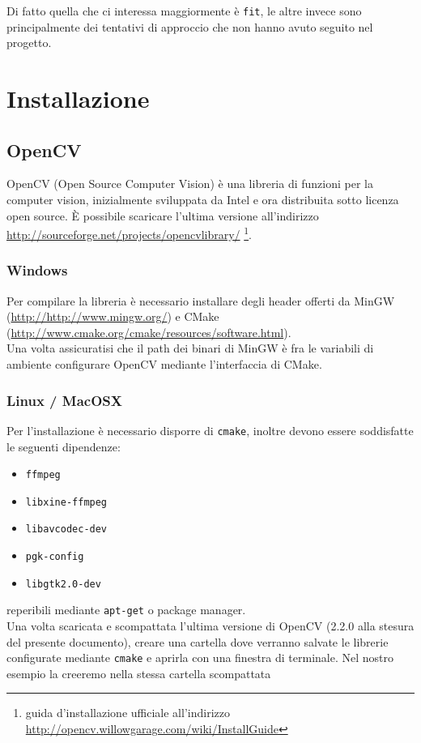 \documentclass[12pt]{report}
\begin{document}
\noindent Di fatto quella che ci interessa maggiormente \`e \verb|fit|, le altre invece sono principalmente dei tentativi di approccio che non hanno avuto seguito nel progetto.

\chapter{Installazione}
\section{OpenCV}
OpenCV (Open Source Computer Vision) \`e una libreria di funzioni per la computer vision, inizialmente sviluppata da Intel e ora distribuita sotto licenza open source. \`E possibile scaricare l'ultima versione all'indirizzo \url{http://sourceforge.net/projects/opencvlibrary/} \footnote{guida d'installazione ufficiale all'indirizzo \url{http://opencv.willowgarage.com/wiki/InstallGuide}}.

\subsection{Windows}
Per compilare la libreria \`e necessario installare degli header offerti da MinGW (\url{http://http://www.mingw.org/}) e CMake (\url{http://www.cmake.org/cmake/resources/software.html}).\\
\noindent Una volta assicuratisi che il path dei binari di MinGW \`e fra le variabili di ambiente configurare OpenCV mediante l'interfaccia di CMake.

\subsection{Linux / MacOSX}

\noindent Per l'installazione \`e necessario disporre di \verb|cmake|, inoltre devono essere soddisfatte le seguenti dipendenze:
\begin{itemize}
\item \verb|ffmpeg|
\item \verb|libxine-ffmpeg|
\item \verb|libavcodec-dev|
\item \verb|pgk-config|
\item \verb|libgtk2.0-dev|
\end{itemize}

\noindent reperibili mediante \verb|apt-get| o package manager.\\

\noindent Una volta scaricata e scompattata l'ultima versione di OpenCV (2.2.0 alla stesura del presente documento), creare una cartella dove verranno salvate le librerie configurate mediante \verb|cmake| e aprirla con una finestra di terminale. Nel nostro esempio la creeremo nella stessa cartella scompattata
\end{document}

